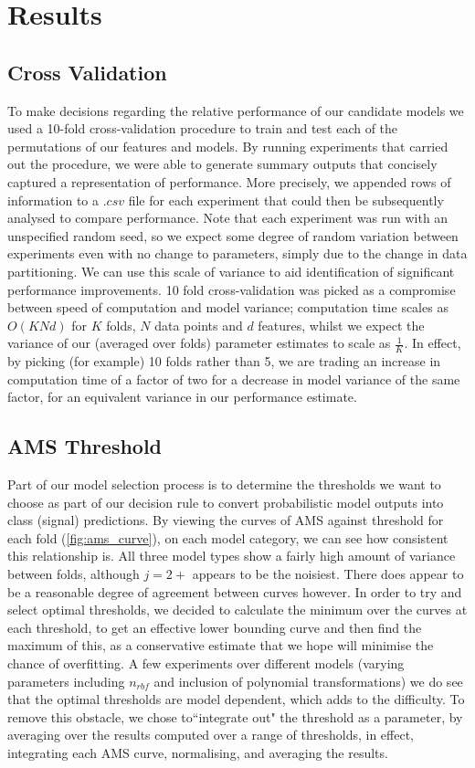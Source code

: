 \section{Results}
\label{results}

\subsection{Cross Validation}
To make decisions regarding the relative performance of our candidate models we used a 10-fold cross-validation procedure to train and test each of the permutations of our features and models. By running experiments that carried out the procedure, we were able to generate summary outputs that concisely captured a representation of performance. More precisely, we appended rows of information to a $.csv$ file for each experiment that could then be subsequently analysed to compare performance. Note that each experiment was run with an unspecified random seed, so we expect some degree of random variation between experiments even with no change to parameters, simply due to the change in data partitioning. We can use this scale of variance to aid identification of significant performance improvements. 10 fold cross-validation was picked as a compromise between speed of computation and model variance; computation time scales as $O(KNd)$ for $K$ folds, $N$ data points and $d$ features, whilst we expect the variance of our (averaged over folds) parameter estimates to scale as $\frac{1}{K}$. In effect, by picking (for example) 10 folds rather than 5, we are trading an increase in computation time of a factor of two for a decrease in model variance of the same factor, for an equivalent variance in our performance estimate.

\subsection{AMS Threshold}
Part of our model selection process is to determine the thresholds we want to choose as part of our decision rule to convert probabilistic model outputs into class (signal) predictions. By viewing the curves of AMS against threshold for each fold (\ref{fig:ams_curve}), on each model category, we can see how consistent this relationship is. All three model types show a fairly high amount of variance between folds, although $j=2+$ appears to be the noisiest. There does appear to be a reasonable degree of agreement between curves however. In order to try and select optimal thresholds, we decided to calculate the minimum over the curves at each threshold, to get an effective lower bounding curve and then find the maximum of this, as a conservative estimate that we hope will minimise the chance of overfitting. 
A few experiments over different models (varying parameters including $n_{rbf}$ and inclusion of polynomial transformations) we do see that the optimal thresholds are model dependent, which adds to the difficulty. To remove this obstacle, we chose to``integrate out" the threshold as a parameter, by averaging over the results computed over a range of thresholds, in effect, integrating each AMS curve, normalising, and averaging the results.

